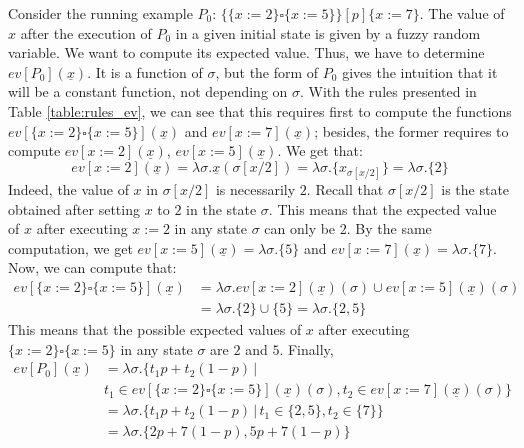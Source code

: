 \documentclass[a4paper,10pt]{llncs}
\begin{document}
Consider the running example $P_0$: $\{ \{x := 2\} \square \{x := 5\} \} [p] \{ x := 7 \}$. The value of $x$ after the execution of $P_0$ in a given initial state is given by a fuzzy random variable. We want to compute its expected value. Thus, we have to determine $ev[P_0](\underline{x})$. It is a function of $\sigma$, but the form of $P_0$ gives the intuition that it will be a constant function, not depending on $\sigma$.\newline
With the rules presented in Table \ref{table:rules_ev}, we can see that this requires first to compute the functions $ev[\{x := 2\} \square \{x := 5\}](\underline{x})$ and $ev[x := 7](\underline{x})$; besides, the former requires to compute $ev[x := 2](\underline{x})$, $ev[x := 5](\underline{x})$. We get that:
$$ev[x := 2](\underline{x}) = \lambda\sigma.\underline{x}(\sigma[x/2]) = \lambda\sigma.\{x_{\sigma[x/2]}\} = \lambda\sigma.\{2\}$$ 
Indeed, the value of $x$ in $\sigma[x/2]$ is necessarily $2$. Recall that $\sigma[x/2]$ is the state obtained after setting $x$ to $2$ in the state $\sigma$. This means that the expected value of $x$ after executing $x := 2$ in any state $\sigma$ can only be $2$. By the same computation, we get $ev[x := 5](\underline{x}) = \lambda\sigma.\{5\}$ and $ev[x := 7](\underline{x}) = \lambda\sigma.\{7\}$.\newline
Now, we can compute that:
\begin{align*}
ev[\{x := 2\} \square \{x := 5\}](\underline{x}) &= \lambda\sigma. ev[x := 2](\underline{x})(\sigma) \cup ev[x := 5](\underline{x})(\sigma) \\
&= \lambda\sigma. \{2\} \cup \{5\} = \lambda\sigma.\{2,5\} 
\end{align*}
This means that the possible expected values of $x$ after executing $\{x := 2\} \square \{x := 5\}$ in any state $\sigma$ are $2$ and $5$. Finally, 
\begin{align*}
ev[P_0](\underline{x}) &= \lambda\sigma.\{t_1 p+t_2(1-p) \,|\, \\
& t_1 \in ev[\{x := 2\} \square \{x := 5\}](\underline{x})(\sigma), t_2 \in ev[x := 7](\underline{x})(\sigma) \} \\
&= \lambda\sigma.\{t_1 p+t_2(1-p) \,|\, t_1 \in \{2,5\}, t_2 \in \{7\} \} \\
&= \lambda\sigma. \{2p+7(1-p),5p+7(1-p) \} 
\end{align*}
\end{document}
